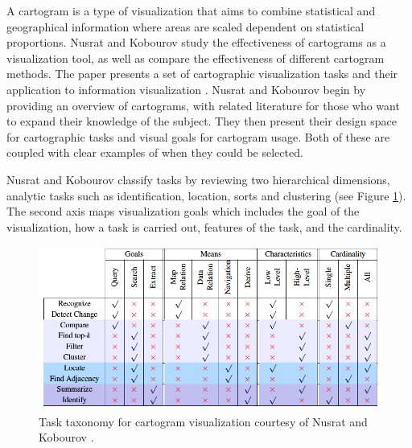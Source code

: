 A cartogram is a type of visualization that aims to combine statistical and geographical information where areas are scaled dependent on statistical proportions. Nusrat and Kobourov study the effectiveness of cartograms as a visualization tool, as well as compare the effectiveness of different cartogram methods. The paper presents a set of cartographic visualization tasks and their application to information visualization \cite{nusrat2015task}.
Nusrat and Kobourov begin by providing an overview of cartograms, with related literature for those who want to expand their knowledge of the subject. They then present their design space for cartographic tasks and visual goals for cartogram usage. Both of these are coupled with clear examples of when they could be selected. 

Nusrat and Kobourov classify tasks by reviewing two hierarchical dimensions, analytic tasks such as identification, location, sorts and clustering (see Figure \ref{fig: nusrat2015task}). The second axis maps visualization goals which includes the goal of the visualization, how a task is carried out, features of the task, and the cardinality. 

\begin{figure}[t]
\begin{center}
\includegraphics[width=1\textwidth]{images/nusrat2015taskFullp}
\caption{Task taxonomy for cartogram visualization courtesy of Nusrat and Kobourov \cite{nusrat2015task}.} \label{fig: nusrat2015task}
\end{center}
\end{figure}

